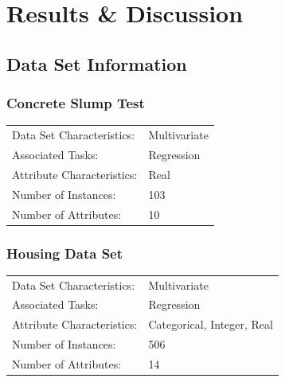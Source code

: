 \documentclass[11pt, a4paper]{report}
\begin{document}
\newpage


%
%
%
%

\newpage

\chapter{Results \& Discussion}

\section{Data Set Information}

\subsection{Concrete Slump Test}
\begin{tabular}{l l}
	Data Set Characteristics:  & Multivariate \\
	Associated Tasks: & Regression  \\
	Attribute Characteristics: & Real \\
	Number of Instances: & 103 \\
	Number of Attributes: & 10 \\
\end{tabular}

\subsection{Housing Data Set}
\begin{tabular}{l l}
	Data Set Characteristics:  & Multivariate \\
	Associated Tasks: & Regression  \\
	Attribute Characteristics: & Categorical, Integer, Real \\
	Number of Instances: & 506 \\
	Number of Attributes: & 14 \\
\end{tabular}
\end{document}
